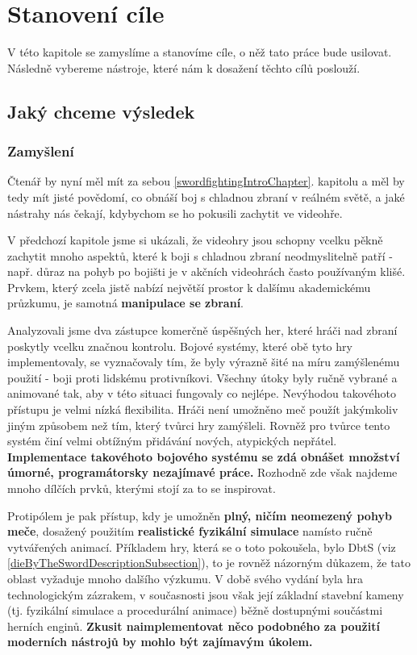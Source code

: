 \chapter{Stanovení cíle}

V této kapitole se zamyslíme a stanovíme cíle, o něž tato práce bude usilovat. Následně vybereme nástroje, které nám k dosažení těchto cílů poslouží.  


\section{Jaký chceme výsledek}

\subsection{Zamyšlení}
Čtenář by nyní měl mít za sebou \ref{swordfightingIntroChapter}. kapitolu a měl by tedy mít jisté povědomí, co obnáší boj s chladnou zbraní v reálném světě, a jaké nástrahy nás čekají, kdybychom se ho pokusili zachytit ve videohře. 

V předchozí kapitole jsme si ukázali, že videohry jsou schopny vcelku pěkně zachytit mnoho aspektů, které k boji s chladnou zbraní neodmyslitelně patří - např. důraz na pohyb po bojišti je v akčních videohrách často používaným klišé. Prvkem, který zcela jistě nabízí největší prostor k dalšímu akademickému průzkumu, je samotná \textbf{manipulace se zbraní}.

Analyzovali jsme dva zástupce komerčně úspěšných her, které hráči nad zbraní poskytly vcelku značnou kontrolu. Bojové systémy, které obě tyto hry implementovaly, se vyznačovaly tím, že byly výrazně šité na míru zamýšlenému použití - boji proti lidskému protivníkovi. Všechny útoky byly ručně vybrané a animované tak, aby v této situaci fungovaly co nejlépe. Nevýhodou takovéhoto přístupu je velmi nízká flexibilita. Hráči není umožněno meč použít jakýmkoliv jiným způsobem než tím, který tvůrci hry zamýšleli. Rovněž pro tvůrce tento systém činí velmi obtížným přidávání nových, atypických nepřátel. \textbf{Implementace takovéhoto bojového systému se zdá obnášet množství úmorné, programátorsky nezajímavé práce.} Rozhodně zde však najdeme mnoho dílčích prvků, kterými stojí za to se inspirovat.

Protipólem je pak přístup, kdy je umožněn \textbf{plný, ničím neomezený pohyb meče}, dosažený použitím \textbf{realistické fyzikální simulace} namísto ručně vytvářených animací. Příkladem hry, která se o toto pokoušela, bylo \acl{DbtS} (viz \ref{dieByTheSwordDescriptionSubsection}), to je rovněž názorným důkazem, že tato oblast vyžaduje mnoho dalšího výzkumu. V době svého vydání byla hra technologickým zázrakem, v současnosti jsou však její základní stavební kameny (tj. fyzikální simulace a procedurální animace) běžně dostupnými součástmi herních enginů. \textbf{Zkusit naimplementovat něco podobného za použití moderních nástrojů by mohlo být zajímavým úkolem.}

